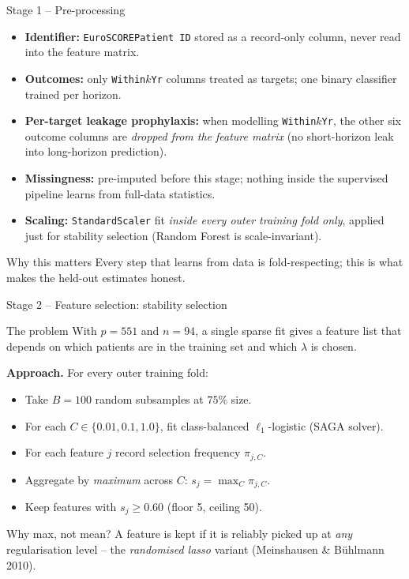 \documentclass[10pt,aspectratio=169]{beamer}
\begin{document}
\begin{frame}{Stage 1 -- Pre-processing}
  \begin{itemize}
    \item \textbf{Identifier:} \texttt{EuroSCOREPatient ID} stored as a
          record-only column, never read into the feature matrix.
    \item \textbf{Outcomes:} only \texttt{Within$k$Yr} columns treated as
          targets; one binary classifier trained per horizon.
    \item \textbf{Per-target leakage prophylaxis:} when modelling
          \texttt{Within$k$Yr}, the other six outcome columns are
          \emph{dropped from the feature matrix} (no short-horizon leak
          into long-horizon prediction).
    \item \textbf{Missingness:} pre-imputed before this stage; nothing
          inside the supervised pipeline learns from full-data statistics.
    \item \textbf{Scaling:} \texttt{StandardScaler} fit \emph{inside every
          outer training fold only}, applied just for stability selection
          (Random Forest is scale-invariant).
  \end{itemize}
  \begin{block}{Why this matters}
    Every step that learns from data is fold-respecting; this is what
    makes the held-out estimates honest.
  \end{block}
\end{frame}

\begin{frame}{Stage 2 -- Feature selection: stability selection}
  \begin{block}{The problem}
    With $p=551$ and $n=94$, a single sparse fit gives a feature list that
    depends on which patients are in the training set and which $\lambda$
    is chosen.
  \end{block}
  \textbf{Approach.} For every outer training fold:
  \begin{itemize}
    \item Take $B=100$ random subsamples at $75\%$ size.
    \item For each $C\in\{0.01, 0.1, 1.0\}$, fit class-balanced
          $\ell_1$-logistic (SAGA solver).
    \item For each feature $j$ record selection frequency
          $\pi_{j,C}$.
    \item Aggregate by \emph{maximum} across $C$:
          $s_j = \max_C \pi_{j,C}$.
    \item Keep features with $s_j \ge 0.60$ (floor 5, ceiling 50).
  \end{itemize}
  \begin{block}{Why max, not mean?}
    A feature is kept if it is reliably picked up at \emph{any} regularisation level
    -- the \emph{randomised lasso} variant (Meinshausen \& B\"uhlmann 2010).
  \end{block}
\end{frame}
\end{document}
